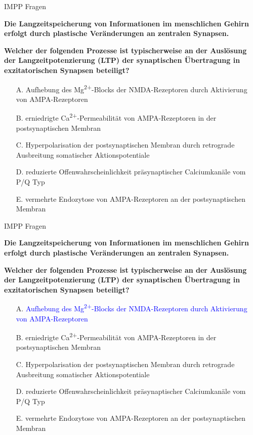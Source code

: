 \documentclass{beamer}
\begin{document}

\begin{frame}{IMPP Fragen}

\textbf{Die Langzeitspeicherung von Informationen im menschlichen Gehirn erfolgt durch plastische Veränderungen an zentralen Synapsen.}

\textbf{Welcher der folgenden Prozesse ist typischerweise an der Auslösung der Langzeitpotenzierung (LTP) der synaptischen Übertragung in exzitatorischen Synapsen beteiligt? } \\[0.2 cm]

\begin{itemize}
\item[A.] Aufhebung des Mg\textsuperscript{2+}-Blocks der NMDA-Rezeptoren durch Aktivierung von AMPA-Rezeptoren
\item[B.] erniedrigte Ca\textsuperscript{2+}-Permeabilität von AMPA-Rezeptoren in der postsynaptischen Membran
\item[C.] Hyperpolarisation der postsynaptischen Membran durch retrograde Ausbreitung somatischer Aktionspotentiale
\item[D.] reduzierte Offenwahrscheinlichkeit präsynaptischer Calciumkanäle vom P/Q Typ
\item[E.] vermehrte Endozytose von AMPA-Rezeptoren an der postsynaptischen Membran

\end{itemize}

\end{frame}


\begin{frame}{IMPP Fragen}

\textbf{Die Langzeitspeicherung von Informationen im menschlichen Gehirn erfolgt durch plastische Veränderungen an zentralen Synapsen.}

\textbf{Welcher der folgenden Prozesse ist typischerweise an der Auslösung der Langzeitpotenzierung (LTP) der synaptischen Übertragung in exzitatorischen Synapsen beteiligt? } \\[0.2 cm]

\begin{itemize}
\item[A.] \textcolor{blue}{Aufhebung des Mg\textsuperscript{2+}-Blocks der NMDA-Rezeptoren durch Aktivierung von AMPA-Rezeptoren}
\item[B.] erniedrigte Ca\textsuperscript{2+}-Permeabilität von AMPA-Rezeptoren in der postsynaptischen Membran
\item[C.] Hyperpolarisation der postsynaptischen Membran durch retrograde Ausbreitung somatischer Aktionspotentiale
\item[D.] reduzierte Offenwahrscheinlichkeit präsynaptischer Calciumkanäle vom P/Q Typ
\item[E.] vermehrte Endozytose von AMPA-Rezeptoren an der postsynaptischen Membran

\end{itemize}

\end{frame}
\end{document}
